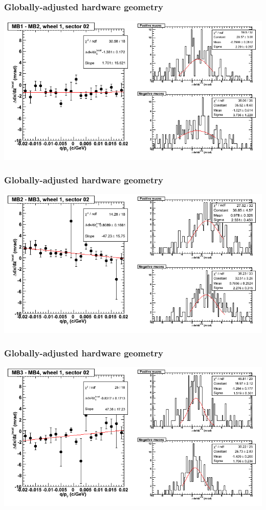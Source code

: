 \documentclass[compress]{beamer}
\begin{document}
\begin{frame}
\frametitle{Globally-adjusted hardware geometry}
\includegraphics[width=\linewidth]{NOV4_segdiffs_HW/dt13_slope_D_02_12.png}
\end{frame}

\begin{frame}
\frametitle{Globally-adjusted hardware geometry}
\includegraphics[width=\linewidth]{NOV4_segdiffs_HW/dt13_slope_D_02_23.png}
\end{frame}

\begin{frame}
\frametitle{Globally-adjusted hardware geometry}
\includegraphics[width=\linewidth]{NOV4_segdiffs_HW/dt13_slope_D_02_34.png}
\end{frame}
\end{document}
